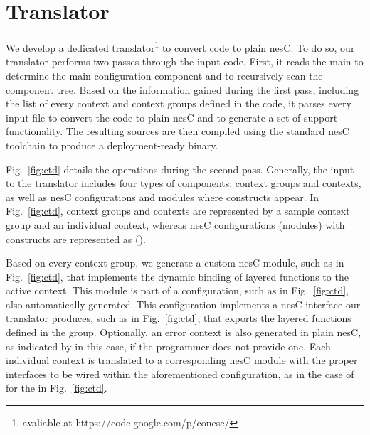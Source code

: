  \section{Translator}\label{sec:translator}

 We develop a dedicated translator\footnote{avaliable at https://code.google.com/p/conesc/} to convert \conesc code to plain
 nesC. To do so, our translator performs two passes through the input
 code. First, it reads the main  to determine the main
 configuration component and to recursively scan the component
 tree. Based on the information gained during the first pass,
 including the list of every context and context groups defined in the
 code, it parses every input file to convert the \conesc code to plain
 nesC and to generate a set of support functionality. The resulting
 sources are then compiled using the standard nesC toolchain to
 produce a deployment-ready binary.


Fig.~\ref{fig:ctd} details the operations during the second
pass. Generally, the input to the translator includes four types of
components: context groups and contexts, as well as nesC
configurations and modules where \conesc constructs appear.  In
Fig.~\ref{fig:ctd}, context groups and contexts are represented by a
sample  context group and an individual 
context, whereas nesC configurations (modules) with \conesc
constructs are represented as  ().

Based on every context group, we generate a custom nesC module, such
as  in Fig.~\ref{fig:ctd}, that implements the
dynamic binding of layered functions to the active context. This
module is part of a configuration, such as  in
Fig.~\ref{fig:ctd}, also automatically generated. This configuration
implements a nesC interface our translator produces, such as
 in Fig.~\ref{fig:ctd}, that exports the layered
functions defined in the group. Optionally, an error context is also
generated in plain nesC, as indicated by  in this
case, if the programmer does not provide one. Each individual context
is translated to a corresponding nesC module with the proper
interfaces to be wired within the aforementioned configuration, as in
the case of  for the  in
Fig.~\ref{fig:ctd}.

